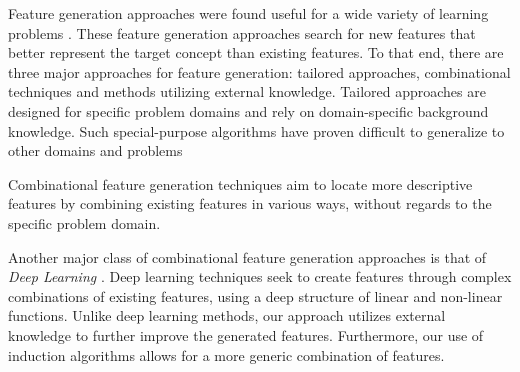 \documentclass{article}
\theoremstyle{definition}
\begin{document}
Feature generation approaches were found useful for a wide variety of learning problems \citep{markovitch2002feature,ragavan1993complex,utgo1991linear}.
These feature generation approaches search for new features that better represent the target concept than existing features. To that end, there are three major approaches for feature generation: tailored approaches, combinational techniques and methods utilizing external knowledge.
Tailored approaches \citep{hirsh1994bootstrapping} are designed for specific problem domains and rely on domain-specific background knowledge. %
Such special-purpose algorithms%
 have proven difficult to generalize to other domains and problems

Combinational feature generation techniques aim to locate more descriptive features by combining existing features in various ways, without regards to the specific problem domain. %

Another major class of combinational feature generation approaches is that of \emph{Deep Learning} \citep{plotz2011featurefull,kim2013deepfull}. Deep learning techniques seek to create features through complex combinations of existing features, using a deep structure of linear and non-linear functions.
Unlike deep learning methods, our approach utilizes external knowledge to further improve the generated features. Furthermore, our use of induction algorithms allows for a more generic combination of features.
\end{document}
